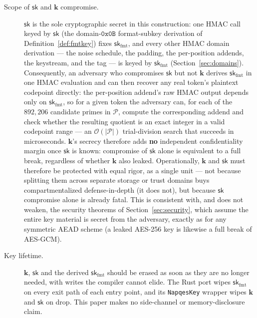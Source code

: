 \documentclass[11pt,a4paper]{article}
\begin{document}
\begin{description}
  \item[Scope of $\mathsf{sk}$ and $\mathbf{k}$ compromise.] $\mathsf{sk}$
        is the sole cryptographic secret in this construction: one HMAC
        call keyed by $\mathsf{sk}$ (the domain-$\texttt{0x0B}$
        format-subkey derivation of Definition~\ref{def:fmtkey}) fixes
        $\mathsf{sk}_{\mathrm{fmt}}$, and every other HMAC domain
        derivation — the noise schedule, the padding, the per-position
        addends, the keystream, and the tag — is keyed by
        $\mathsf{sk}_{\mathrm{fmt}}$ (Section~\ref{sec:domains}).
        Consequently, an adversary who compromises $\mathsf{sk}$ but not
        $\mathbf{k}$ derives $\mathsf{sk}_{\mathrm{fmt}}$ in one HMAC
        evaluation and can then recover any real token's plaintext
        codepoint directly: the per-position addend's raw HMAC output
        depends only on $\mathsf{sk}_{\mathrm{fmt}}$, so for a given
        token the adversary can, for each of the $892{,}206$ candidate
        primes in $\mathcal{P}$, compute the corresponding addend and
        check whether the resulting quotient is an exact integer in a
        valid codepoint range — an $\mathcal{O}(|\mathcal{P}|)$
        trial-division search that succeeds in microseconds.
        $\mathbf{k}$'s secrecy therefore adds \textbf{no} independent
        confidentiality margin once $\mathsf{sk}$ is known: compromise of
        $\mathsf{sk}$ alone is equivalent to a full break, regardless of
        whether $\mathbf{k}$ also leaked. Operationally,
        $\mathbf{k}$ and $\mathsf{sk}$ must therefore be protected with
        equal rigor, as a single unit — not because splitting them across
        separate storage or trust domains buys compartmentalized
        defense-in-depth (it does not), but because $\mathsf{sk}$
        compromise alone is already fatal. This is consistent with, and
        does not weaken, the security theorems of
        Section~\ref{sec:security}, which assume the entire key material
        is secret from the adversary, exactly as for any symmetric AEAD
        scheme (a leaked AES-256 key is likewise a full break of AES-GCM).

  \item[Key lifetime.] $\mathbf{k}$, $\mathsf{sk}$ and the derived
        $\mathsf{sk}_{\mathrm{fmt}}$ should be erased as soon as they are no
        longer needed, with writes the compiler cannot elide. The Rust port
        wipes $\mathsf{sk}_{\mathrm{fmt}}$ on every exit path of each entry
        point, and its \texttt{NapqesKey} wrapper wipes $\mathbf{k}$ and
        $\mathsf{sk}$ on drop. This paper makes no side-channel or
        memory-disclosure claim.


\end{description}
\end{document}
